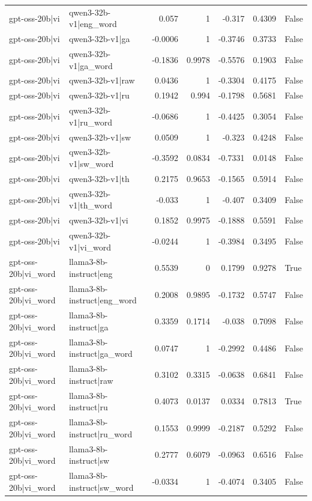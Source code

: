 \begin{table}
\begin{tabular}{l l r r r r l}
gpt-oss-20b|vi & qwen3-32b-v1|eng_word & 0.057 & 1 & -0.317 & 0.4309 & False \\
gpt-oss-20b|vi & qwen3-32b-v1|ga & -0.0006 & 1 & -0.3746 & 0.3733 & False \\
gpt-oss-20b|vi & qwen3-32b-v1|ga_word & -0.1836 & 0.9978 & -0.5576 & 0.1903 & False \\
gpt-oss-20b|vi & qwen3-32b-v1|raw & 0.0436 & 1 & -0.3304 & 0.4175 & False \\
gpt-oss-20b|vi & qwen3-32b-v1|ru & 0.1942 & 0.994 & -0.1798 & 0.5681 & False \\
gpt-oss-20b|vi & qwen3-32b-v1|ru_word & -0.0686 & 1 & -0.4425 & 0.3054 & False \\
gpt-oss-20b|vi & qwen3-32b-v1|sw & 0.0509 & 1 & -0.323 & 0.4248 & False \\
gpt-oss-20b|vi & qwen3-32b-v1|sw_word & -0.3592 & 0.0834 & -0.7331 & 0.0148 & False \\
gpt-oss-20b|vi & qwen3-32b-v1|th & 0.2175 & 0.9653 & -0.1565 & 0.5914 & False \\
gpt-oss-20b|vi & qwen3-32b-v1|th_word & -0.033 & 1 & -0.407 & 0.3409 & False \\
gpt-oss-20b|vi & qwen3-32b-v1|vi & 0.1852 & 0.9975 & -0.1888 & 0.5591 & False \\
gpt-oss-20b|vi & qwen3-32b-v1|vi_word & -0.0244 & 1 & -0.3984 & 0.3495 & False \\
gpt-oss-20b|vi_word & llama3-8b-instruct|eng & 0.5539 & 0 & 0.1799 & 0.9278 & True \\
gpt-oss-20b|vi_word & llama3-8b-instruct|eng_word & 0.2008 & 0.9895 & -0.1732 & 0.5747 & False \\
gpt-oss-20b|vi_word & llama3-8b-instruct|ga & 0.3359 & 0.1714 & -0.038 & 0.7098 & False \\
gpt-oss-20b|vi_word & llama3-8b-instruct|ga_word & 0.0747 & 1 & -0.2992 & 0.4486 & False \\
gpt-oss-20b|vi_word & llama3-8b-instruct|raw & 0.3102 & 0.3315 & -0.0638 & 0.6841 & False \\
gpt-oss-20b|vi_word & llama3-8b-instruct|ru & 0.4073 & 0.0137 & 0.0334 & 0.7813 & True \\
gpt-oss-20b|vi_word & llama3-8b-instruct|ru_word & 0.1553 & 0.9999 & -0.2187 & 0.5292 & False \\
gpt-oss-20b|vi_word & llama3-8b-instruct|sw & 0.2777 & 0.6079 & -0.0963 & 0.6516 & False \\
gpt-oss-20b|vi_word & llama3-8b-instruct|sw_word & -0.0334 & 1 & -0.4074 & 0.3405 & False \\

\end{tabular}
\end{table}
